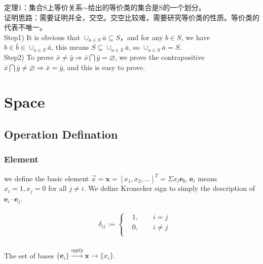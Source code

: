 定理1：集合S上等价关系$\sim$给出的等价类的集合是S的一个划分。\\
证明思路：需要证明并全，交空。交空比较难，需要研究等价类的性质。等价类的代表不唯一。\\
Step1)  It is obvious that $\cup _{a \in S} {\bar a} \subseteq S$，and for any $b \in S$, we have $b \in \bar b \in \cup _{a \in S} {\bar a}$, this means $S \subseteq \cup _{a \in S} {\bar a}  $, so $ \cup _{a \in S} {\bar a} =S $.\\
Step2) To prove $\bar x \neq \bar y \Rightarrow \bar x \bigcap \bar y = \varnothing  $, we prove the contrapositive $ \bar x \bigcap \bar y \neq \varnothing \Rightarrow  \bar x = \bar y$, and this is easy to prove.\\







\section{Space}

\subsection{Operation Defination}

\subsubsection{Element}

we define the basic element $ \vec{x}  = \boldsymbol x = [x_1, x_2,\dots]^T = \Sigma x_i \boldsymbol{e_i}$, $ \boldsymbol e_i $ means $x_i = 1, x_j = 0$ for all $j \neq i$. We define Kronecker sign to simply the description of $\boldsymbol e_i \cdot \boldsymbol e_j $.

\begin{equation}
    \begin{split}
    &\delta _{ij}:=
    \begin{cases}
    &1,\qquad i = j\\
    &0,\qquad i \neq j\\
    \end{cases}\\
    \end{split}
\end{equation}

The set of bases $\{ \boldsymbol e_i  \}  \stackrel{apply}{\longrightarrow} \boldsymbol{x} \longrightarrow    \{ x_i \}   $.




